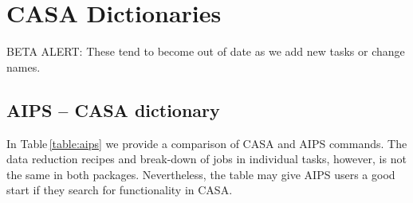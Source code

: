 

\chapter[Appendix: CASA Dictionaries]{CASA Dictionaries}
\label{chapter:dict}

{BETA ALERT:} These tend to become out of date as we add new tasks
or change names.

\section{AIPS -- CASA dictionary}
\label{section:dict.aips}

In Table\,\ref{table:aips} we provide a comparison of CASA and AIPS
commands. The data reduction recipes and break-down of jobs in
individual tasks, however, is not the same in both
packages. Nevertheless, the table may give AIPS users a good start if
they search for functionality in CASA. 



